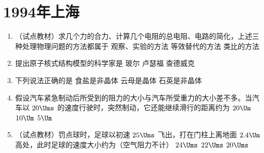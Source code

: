 \documentclass[\gkver]{gaokaozhenti}
\begin{document}
\chapter{1994年上海}

\begin{enumerate}
\item
（试点教材）求几个力的合力、计算几个电阻的总电阻、电路的简化，上述三种处理物理问题的方法都属于
{观察、实验的方法}
{等效替代的方法}
{类比的方法}

\item
提出原子核式结构模型的科学家是
{玻尔}
{卢瑟福}
{查德威克}

\item
下列说法正确的是
{食盐是非晶体}
{云母是晶体}
{石英是非晶体}

\item
假设汽车紧急制动后所受到的阻力的大小与汽车所受重力的大小差不多。当汽车以 $20\Ums$ 的速度行驶时，突然制动，它还能继续滑行的距离约为
\fourchoices[answer=B]
{$40\Um$}
{$20\Um$}
{$10\Um$}
{$5\Um$}

\item
（试点教材）罚点球时，足球以初速 $25\Ums$ 飞出，打在门柱上离地面 $2.4\Um$ 高处，此时足球的速度大小约为（空气阻力不计）
\fourchoices[answer=B]
{$25\Ums$}
{$24\Ums$}
{$22\Ums$}
{$20\Ums$}


\end{enumerate}
\end{document}
